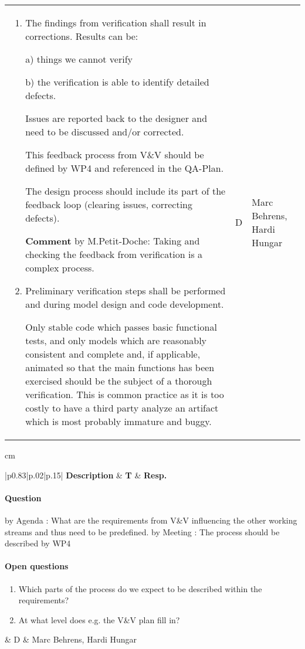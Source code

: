 \documentclass[a4paper]{article}
\newcommand{\Q}[2]{\paragraph{Question} 
	\ifthenelse{\isempty{#1}}%
    	{}%
    	{by #1}%
    : #2}
\newcommand{\A}[2]{\newline{\textbf{Answer}}
	\ifthenelse{\isempty{#1}}%
    	{}%
    	{by #1}%
    : #2}
\newcommand{\C}[2]{\textbf{Comment} by #1: #2}
\begin{document}
\begin{longtable}{|p{}|p{}|p{}|}
\begin{enumerate}
      \item The findings from verification shall result in
        corrections.  Results can be:
		
        a) things we cannot verify
		
        b) the verification is able to identify detailed defects.

        Issues are reported back to the designer and need to be
        discussed and/or corrected.
		
        This feedback process from V\&V should be defined by WP4 and
        referenced in the QA-Plan.
	
        The design process should include its part of the feedback
        loop (clearing issues, correcting defects).
		
        \C{M.Petit-Doche}{Taking and checking the feedback from verification is a complex process.}

      \item Preliminary verification steps shall be performed and
        during model design and code development.


	Only stable code which passes basic functional tests, and only
        models which are reasonably consistent and complete and, if
        applicable, animated so that the main functions has been exercised
        should be the subject of a thorough verification. This is
        common practice as it is too costly to have a third party
        analyze an artifact which is most probably immature and buggy.
\end{enumerate}

		& D & Marc Behrens, \newline Hardi Hungar
		\end{longtable}
        		 cm 
		        \clearpage
	    \begin{longtable}{|p{}|p{}|p{}|}
	    \hline
	    \textbf{Description} & \textbf{T} & \textbf{Resp.} 
	    \endhead
	    \hline
	    \newline

	
\Q{Agenda}{What are the requirements from V\&V influencing the other working streams and thus need to be predefined.}
\A{Meeting}{The process should be described by WP4}

\paragraph{Open questions}
\begin{enumerate}
	\item Which parts of the process do we expect to be described within the requirements?
	\item At what level does e.g. the V\&V plan fill in?
\end{enumerate}

& D
& Marc Behrens, \newline
Hardi Hungar
\\\hline
\end{longtable}
\end{document}
